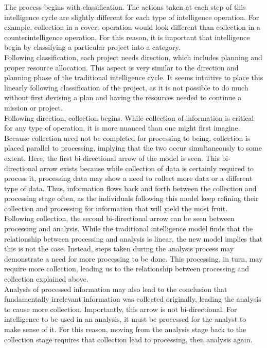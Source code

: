 \documentclass[10pt, letterpaper]{article}
\begin{document}
The process begins with classification. The actions taken at each step of this intelligence cycle are slightly different for each type of intelligence operation. For example, collection in a covert operation would look different than collection in a counterintelligence operation. For this reason, it is important that intelligence begin by classifying a particular project into a category. \\

Following classification, each project needs direction, which includes planning and proper resource allocation. This aspect is very similar to the direction and planning phase of the traditional intelligence cycle. It seems intuitive to place this linearly following classification of the project, as it is not possible to do much without first devising a plan and having the resources needed to continue a mission or project. \\

Following direction, collection begins. While collection of information is critical for any type of operation, it is more nuanced than one might first imagine. Because collection need not be completed for processing to being, collection is placed parallel to processing, implying that the two occur simultaneously to some extent. Here, the first bi-directional arrow of the model is seen. This bi-directional arrow exists because while collection of data is certainly required to process it, processing data may show a need to collect more data or a different type of data. Thus, information flows back and forth between the collection and processing stage often, as the individuals following this model keep refining their collection and processing for information that will yield the most fruit. \\

Following collection, the second bi-directional arrow can be seen between processing and analysis. While the traditional intelligence model finds that the relationship between processing and analysis is linear, the new model implies that this is not the case. Instead, steps taken during the analysis process may demonstrate a need for more processing to be done. This processing, in turn, may require more collection, leading us to the relationship between processing and collection explained above. \\

Analysis of processed information may also lead to the conclusion that fundamentally irrelevant information was collected originally, leading the analysis to cause more collection. Importantly, this arrow is not bi-directional. For intelligence to be used in an analysis, it must be processed for the analyst to make sense of it. For this reason, moving from the analysis stage back to the collection stage requires that collection lead to processing, then analysis again. \\
\end{document}
